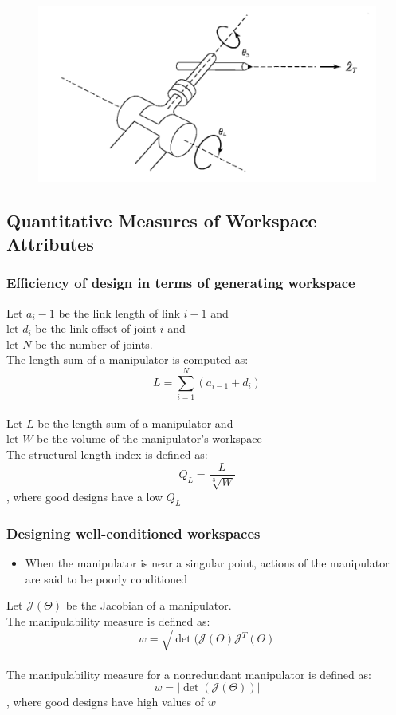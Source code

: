 \documentclass[10pt,a4paper]{article}
\begin{document}
\begin{figure}[H]
	\includegraphics[width=0.5\columnwidth]{imgs/wrist_welding.png}
\end{figure}

\subsection{Quantitative Measures of Workspace Attributes}
\subsubsection{Efficiency of design in terms of generating workspace}
Let $a_i-1$ be the link length of link $i-1$ and \\
let $d_i$ be the link offset of joint $i$ and \\
let $N$ be the number of joints. \\
The length sum of a manipulator is computed as:
$$
	L = \sum_{i = 1}^N(a_{i-1} + d_i)
$$
\\

Let $L$ be the length sum of a manipulator and \\
let $W$ be the volume of the manipulator's workspace \\
The structural length index is defined as:
$$
	Q_L = \frac{L}{\sqrt[3]{W}}
$$
, where good designs have a low $Q_L$

\subsubsection{Designing well-conditioned workspaces}
\begin{itemize}
	\item When the manipulator is near a singular point, actions of the manipulator are said to be poorly conditioned
\end{itemize}
Let $\mathcal{J}(\Theta)$ be the Jacobian of a manipulator. \\
The manipulability measure is defined as:
$$
	w = \sqrt{\det(\mathcal{J}(\Theta)\mathcal{J}^T(\Theta)}
$$
\\

The manipulability measure for a nonredundant manipulator is defined as:
$$
	w = |\det(\mathcal{J}(\Theta))|
$$
, where good designs have high values of $w$ \\
\\
\end{document}
